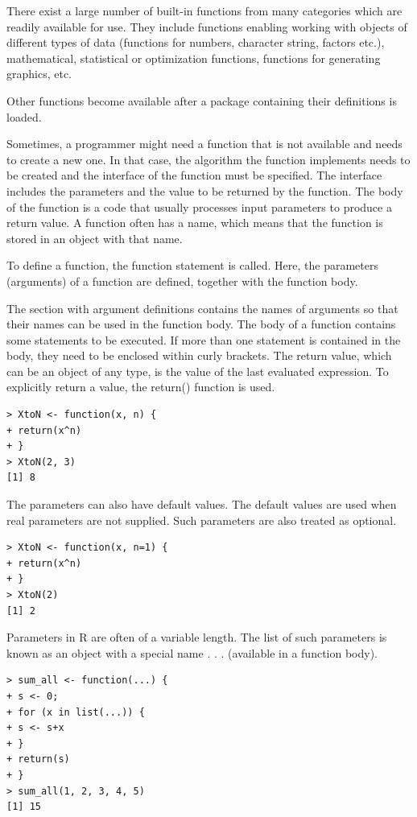 \documentclass[11pt,openany,executivepaper]{book}
\begin{document}
There exist a large number of built-in functions from many categories which are readily available for use. They include functions enabling working with objects of different types of data (functions for numbers, character string, factors etc.), mathematical, statistical or optimization functions, functions for generating graphics, etc.

Other functions become available after a package containing their definitions is loaded.

Sometimes, a programmer might need a function that is not available and needs to create a new one. In that case, the algorithm the function implements needs to be created and the interface of the function must be specified. The interface includes the parameters and the value to be returned by the function. The body of the function is a code that usually processes input parameters to produce a return value. A function often has a name, which means that the function is stored in an object with that name.

To define a function, the function statement is called. Here, the parameters (arguments) of a function are defined, together with the function body.

The section with argument definitions contains the names of arguments so that their names can be used in the function body. The body of a function contains some statements to be executed. If more than one statement is contained in the body, they need to be enclosed within curly brackets. The return value, which can be an object of any type, is the value of the last evaluated expression. To explicitly return a value, the return() function is used.

\begin{verbatim}
> XtoN <- function(x, n) {
+ return(x^n)
+ }
> XtoN(2, 3)
[1] 8
\end{verbatim}

The parameters can also have default values. The default values are used when real parameters are not supplied. Such parameters are also treated as optional.

\begin{verbatim}
> XtoN <- function(x, n=1) {
+ return(x^n)
+ }
> XtoN(2)
[1] 2
\end{verbatim}

Parameters in R are often of a variable length. The list of such parameters is known as an object with a special name . . . (available in a function body).

\begin{verbatim}
> sum_all <- function(...) {
+ s <- 0;
+ for (x in list(...)) {
+ s <- s+x
+ }
+ return(s)
+ }
> sum_all(1, 2, 3, 4, 5)
[1] 15
\end{verbatim}
\end{document}
